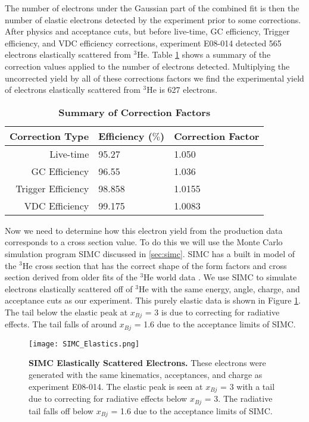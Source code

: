 The number of electrons under the Gaussian part of the combined fit is then the number of elastic electrons detected by the experiment prior to some corrections. After physics and acceptance cuts, but before live-time, GC efficiency, Trigger efficiency, and VDC efficiency corrections, experiment E08-014 detected 565 electrons elastically scattered from $^3$He. Table \ref{tab:corrections} shows a summary of the correction values applied to the number of electrons detected. Multiplying the uncorrected yield by all of these corrections factors we find the experimental yield of electrons elastically scattered from  $^3$He is 627 electrons.

\vspace{5mm}

\begin{table}[!h]
\centering
\begin{tabular}{|r | l l|}
\hline
\textbf{Correction Type} & \textbf{Efficiency ($\%$)} & \textbf{Correction Factor}\\
\hline
Live-time & 95.27 & 1.050 \\ 
GC Efficiency & 96.55 & 1.036 \\ 
Trigger Efficiency & 98.858 & 1.0155 \\ 
VDC Efficiency & 99.175 &  1.0083\\ 
\hline
\end{tabular}
\caption[Summary of Correction Factors]{{\bf{Summary of Correction Factors}} }
\label{tab:corrections}
\end{table}

Now we need to determine how this electron yield from the production data corresponds to a cross section value. To do this we will use the Monte Carlo simulation program SIMC discussed in \ref{sec:simc}. SIMC has a built in model of the $^3$He cross section that has the correct shape of the form factors and cross section derived from older fits of the $^3$He world data \cite{Article:Amroun}. We use SIMC to simulate electrons elastically scattered off of $^3$He with the same energy, angle, charge, and acceptance cuts as our experiment. This purely elastic data is shown in Figure \ref{fig:simc_elastics}. The tail below the elastic peak at $x_{Bj}$ = 3 is due to correcting for radiative effects. The tail falls of around $x_{Bj}$ = 1.6 due to the acceptance limits of SIMC.

\begin{figure}[!ht]
\begin{center}
\texttt{[image: SIMC\_Elastics.png]}
\end{center}
\caption[SIMC Elastically Scattered Electrons]{
{\bf{SIMC Elastically Scattered Electrons.}} These electrons were generated with the same kinematics, acceptances, and charge as experiment E08-014. The elastic peak is seen at $x_{Bj}$ = 3 with a tail due to correcting for radiative effects below $x_{Bj}$ = 3. The radiative tail falls off below $x_{Bj}$ = 1.6 due to the acceptance limits of SIMC.}
\label{fig:simc_elastics}
\end{figure}

